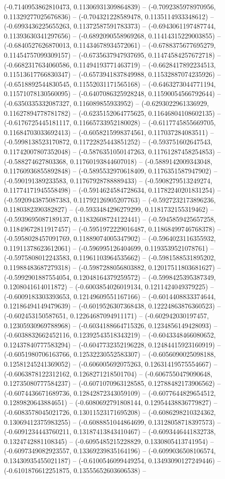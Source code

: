 (-0.7140953862810473, 0.11306931309864839) -- (-0.7092385978970956, 0.11329277025676836) -- (-0.704321228589478, 0.1135114933348612) -- (-0.6993436225655263, 0.11372587591783373) -- (-0.6943061197487744, 0.11393630341297656) -- (-0.6892090558969268, 0.11414315229003855) -- (-0.6840527626870013, 0.11434678934572061) -- (-0.6788375677695279, 0.11454757099309157) -- (-0.6735637947937695, 0.11474584257672718) -- (-0.6682317634060586, 0.11494193771463719) -- (-0.6628417892234513, 0.11513617766830347) -- (-0.6573941837849988, 0.11532887074235926) -- (-0.6518892544830545, 0.11552031171565168) -- (-0.6463273044771194, 0.11571078130560095) -- (-0.6407086325928248, 0.11590054566792644) -- (-0.6350335332087327, 0.116089855933952) -- (-0.6293022961336929, 0.11627894778781782) -- (-0.6235152064775625, 0.11646804108602135) -- (-0.6176725445181117, 0.11665733952180028) -- (-0.6117745855669705, 0.11684703033692413) -- (-0.6058215998374561, 0.117037284083511) -- (-0.5998138523170872, 0.11722825443851252) -- (-0.593751602647543, 0.11742007807352048) -- (-0.5876351050147263, 0.11761287458254853) -- (-0.588274627803368, 0.11760193844607018) -- (-0.5889142009343048, 0.11760936855892848) -- (-0.5895532970618409, 0.1176351587947902) -- (-0.590191389233583, 0.11767928788889433) -- (-0.5908279513249274, 0.11774171945558498) -- (-0.5914624584728634, 0.11782240201831254) -- (-0.5920943875087383, 0.11792126905207763) -- (-0.5927232173896236, 0.1180382390382827) -- (-0.5933484296279299, 0.1181732155319462) -- (-0.5939695087189137, 0.11832608724122441) -- (-0.5945859425657258, 0.11849672811917457) -- (-0.5951972229016487, 0.11868499746768378) -- (-0.5958028457091769, 0.11889074005347902) -- (-0.5964023116355932, 0.11911378623612061) -- (-0.596995126404699, 0.1193539521078761) -- (-0.5975808012243583, 0.11961103964535662) -- (-0.5981588531895202, 0.11988483687279318) -- (-0.5987288056803882, 0.12017511803681627) -- (-0.5992901887554054, 0.12048164379259572) -- (-0.5998425395387349, 0.1208041614011872) -- (-0.6003854026019134, 0.1211424049379225) -- (-0.6009183303393653, 0.12149609551167166) -- (-0.6014408833374644, 0.12186494149479639) -- (-0.6019526307368438, 0.12224863876360523) -- (-0.602453150587651, 0.12264687094911171) -- (-0.602942030197457, 0.12305930969788968) -- (-0.6034188664715326, 0.1234856149428093) -- (-0.6038832662452116, 0.12392543518343219) -- (-0.6043348466080652, 0.12437840777583294) -- (-0.6047732352196228, 0.12484415923160919) -- (-0.6051980706163766, 0.12532230552583307) -- (-0.6056090025098188, 0.12581245241369052) -- (-0.606005692075263, 0.12631419575554667) -- (-0.6063878122312162, 0.1268271218501704) -- (-0.6067550479090648, 0.12735080777584237) -- (-0.6071070963128585, 0.12788482173906562) -- (-0.6074436671689736, 0.12842872343059109) -- (-0.6077644829654512, 0.1289820643884651) -- (-0.6080692791808144, 0.12954438836779827) -- (-0.6083578045021726, 0.13011523171695208) -- (-0.6086298210324362, 0.13069412375983255) -- (-0.6088851044864699, 0.13128058718397573) -- (-0.6091234443760211, 0.13187413843410467) -- (-0.6093446441832738, 0.1324742881108345) -- (-0.6095485215228829, 0.1330805413741954) -- (-0.6097349082923557, 0.13369239835164196) -- (-0.6099036508106574, 0.13430935455021187) -- (-0.6100546099449254, 0.13493090127249446) -- (-0.6101876612251875, 0.13555652603606538) -- 